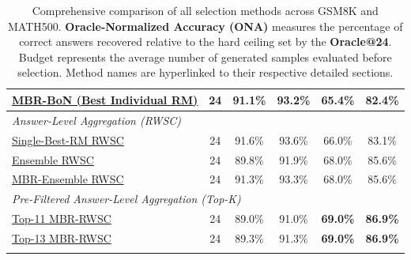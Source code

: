 \documentclass[a4paper,11pt]{article}
\begin{document}
\begin{table}[H]
\begin{tabular}{l c cc cc}
\hyperref[sec:topo]{MBR-BoN (Best Individual RM)} & 24 & 91.1\% & 93.2\% & 65.4\% & 82.4\% \\
\midrule
\multicolumn{6}{l}{\textit{Answer-Level Aggregation (RWSC)}} \\
\hyperref[sec:rwsc]{Single-Best-RM RWSC} & 24 & 91.6\% & 93.6\% & 66.0\% & 83.1\% \\
\hyperref[sec:rwsc]{Ensemble RWSC} & 24 & 89.8\% & 91.9\% & 68.0\% & 85.6\% \\
\hyperref[sec:rwsc]{MBR-Ensemble RWSC} & 24 & 91.3\% & 93.3\% & 68.0\% & 85.6\% \\
\midrule
\multicolumn{6}{l}{\textit{Pre-Filtered Answer-Level Aggregation (Top-K)}} \\
\hyperref[sec:topk]{Top-11 MBR-RWSC} & 24 & 89.0\% & 91.0\% & \textbf{69.0\%} & \textbf{86.9\%} \\
\hyperref[sec:topk]{Top-13 MBR-RWSC} & 24 & 89.3\% & 91.3\% & \textbf{69.0\%} & \textbf{86.9\%} \\
\\
\bottomrule
\end{tabular}
\caption{Comprehensive comparison of all selection methods across GSM8K and MATH500. \textbf{Oracle-Normalized Accuracy (ONA)} measures the percentage of correct answers recovered relative to the hard ceiling set by the \textbf{Oracle@24}. Budget represents the average number of generated samples evaluated before selection. Method names are hyperlinked to their respective detailed sections.}
\label{tab:universal_comparison}
\end{table}
\end{document}
